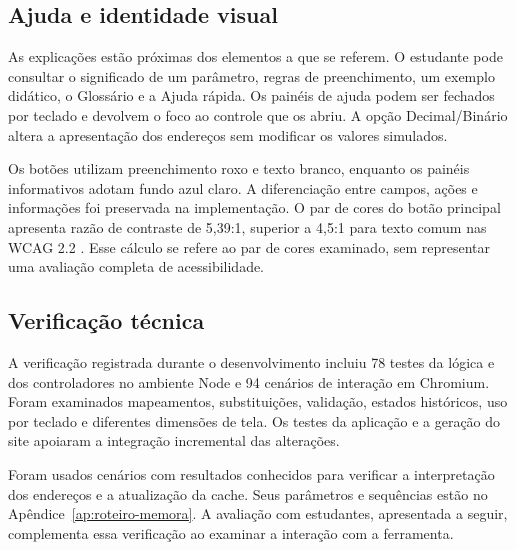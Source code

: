 \subsection{Ajuda e identidade visual}

As explicações estão próximas dos elementos a que se referem. O estudante pode consultar o significado de um parâmetro, regras de preenchimento, um exemplo didático, o Glossário e a Ajuda rápida. Os painéis de ajuda podem ser fechados por teclado e devolvem o foco ao controle que os abriu. A opção Decimal/Binário altera a apresentação dos endereços sem modificar os valores simulados.

Os botões utilizam preenchimento roxo e texto branco, enquanto os painéis informativos adotam fundo azul claro. A diferenciação entre campos, ações e informações foi preservada na implementação. O par de cores do botão principal apresenta razão de contraste de 5,39:1, superior a 4,5:1 para texto comum nas WCAG 2.2 \cite{wcagContraste2026}. Esse cálculo se refere ao par de cores examinado, sem representar uma avaliação completa de acessibilidade.

\subsection{Verificação técnica}
\label{sec:verificacao}

A verificação registrada durante o desenvolvimento incluiu 78 testes da lógica e dos controladores no ambiente Node e 94 cenários de interação em Chromium. Foram examinados mapeamentos, substituições, validação, estados históricos, uso por teclado e diferentes dimensões de tela. Os testes da aplicação e a geração do site apoiaram a integração incremental das alterações.

Foram usados cenários com resultados conhecidos para verificar a interpretação dos endereços e a atualização da cache. Seus parâmetros e sequências estão no Apêndice~\ref{ap:roteiro-memora}. A avaliação com estudantes, apresentada a seguir, complementa essa verificação ao examinar a interação com a ferramenta.
